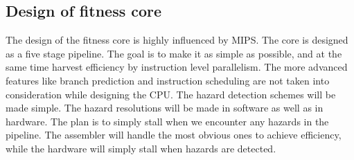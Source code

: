 \subsection{Design of fitness core}

The design of the fitness core is highly influenced by MIPS.
The core is designed as a five stage pipeline.
The goal is to make it as simple as possible, and at the same time harvest efficiency by instruction level parallelism.
The more advanced features like branch prediction and instruction scheduling are not taken into consideration while designing the CPU.
The hazard detection schemes will be made simple.
The hazard resolutions will be made in software as well as in hardware.
The plan is to simply stall when we encounter any hazards in the pipeline.
The assembler will handle the most obvious ones to achieve efficiency, while the hardware will simply stall when hazards are detected.


